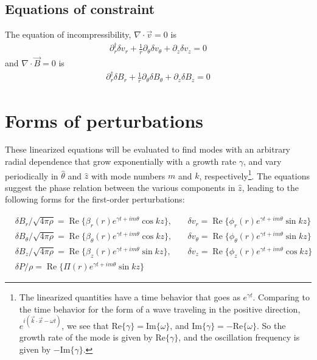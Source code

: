 \documentclass[letterpaper]{article}
\begin{document}
\subsection{Equations of constraint}

The equation of incompressibility, $\nabla\cdot\vec{v}=0$ is
\begin{align}
\partial_r^\dagger \delta v_r + \frac{1}{r}\partial_\theta \delta v_\theta
 + \partial_z \delta v_z = 0
\end{align}
and $\nabla\cdot\vec{B}=0$ is
\begin{align}
\partial_r^\dagger \delta B_r + \frac{1}{r}\partial_\theta \delta B_\theta
 + \partial_z \delta B_z = 0
\end{align}

\section{Forms of perturbations}

These linearized equations will be evaluated to find modes with an
arbitrary radial dependence that grow exponentially with a growth rate
$\gamma$, and vary periodically in $\hat{\theta}$ and $\hat{z}$ with
mode numbers $m$ and $k$, respectively\footnote{The linearized quantities
have a time behavior that goes as $e^{\gamma t}$. Comparing to the
time behavior for the form of a wave traveling in the positive
direction, $e^{i(\vec{k} \cdot \vec{x} - \omega t)}$, we see that
$\mathrm{Re}\{\gamma\} = \mathrm{Im}\{\omega\}$, and
$\mathrm{Im}\{\gamma\} = -\mathrm{Re}\{\omega\}$. So the growth rate
of the mode is given by $\mathrm{Re}\{\gamma\}$, and the oscillation
frequency is given by $-\mathrm{Im}\{\gamma\}$.}.
The equations suggest the phase relation between the various
components in $\hat{z}$, leading to the following forms for the
first-order perturbations:

\begin{align}
&\delta B_r / \sqrt{4\pi\rho} = \operatorname{Re}\{\beta_r (r)
 e^{\gamma t + im\theta}\cos{kz}\},\quad
&\delta v_r = \operatorname{Re}\{\phi_r (r)
 e^{\gamma t + im\theta} \sin{kz}\}
\nonumber \\
&\delta B_\theta / \sqrt{4\pi\rho} = \operatorname{Re}\{\beta_\theta (r)
 e^{\gamma t + im\theta} \cos{kz}\},\quad
&\delta v_\theta = \operatorname{Re}\{\phi_\theta (r)
 e^{\gamma t + im\theta} \sin{kz}\}
\nonumber \\
&\delta B_z / \sqrt{4\pi\rho} = \operatorname{Re}\{\beta_z (r)
 e^{\gamma t + im\theta} \sin{kz}\},\quad
&\delta v_z = \operatorname{Re}\{\phi_z (r) e^{\gamma t+im\theta}\cos{kz}\}
\nonumber \\
&\delta P/ \rho = \operatorname{Re}\{\Pi (r)
 e^{\gamma t + im\theta} \sin{kz}\}&
\end{align}
\end{document}
